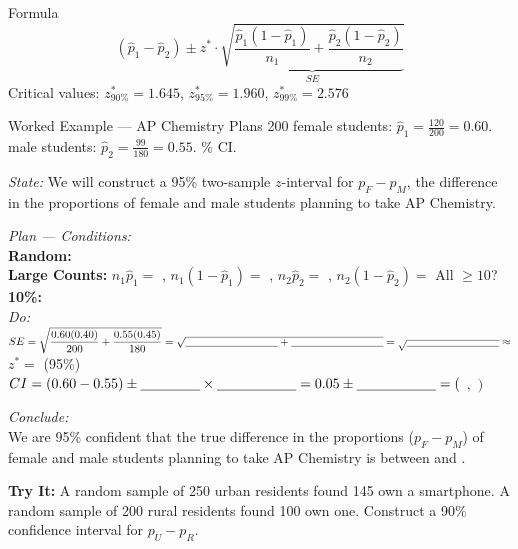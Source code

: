 \documentclass[10pt]{article}
\begin{document}
\begin{notesbox}{Formula}
\[(\hat p_1 - \hat p_2) \pm z^* \cdot \underbrace{\sqrt{\dfrac{\hat p_1(1-\hat p_1)}{n_1}
    + \dfrac{\hat p_2(1-\hat p_2)}{n_2}}}_{SE}\]
\vspace{4pt}
Critical values: $z^*_{90\%}=1.645$, \quad $z^*_{95\%}=1.960$, \quad $z^*_{99\%}=2.576$
\end{notesbox}

\begin{notesbox}{Worked Example --- AP Chemistry Plans}
200 female students: $\hat p_1 = \frac{120}{200} = 0.60$.  male students: $\hat p_2 = \frac{99}{180} = 0.55$. \% CI.

\textit{State:} We will construct a 95\% two-sample $z$-interval for $p_F - p_M$, the difference
in the proportions of female and male students planning to take AP Chemistry.

\textit{Plan --- Conditions:}\\
\textbf{Random:} \blank{7cm} \\
\textbf{Large Counts:} $n_1\hat p_1 = $ \blank{2cm}, $n_1(1-\hat p_1) = $ \blank{2cm},
$n_2\hat p_2 = $ \blank{2cm}, $n_2(1-\hat p_2) = $ \blank{2cm} \quad All $\ge 10$? \blank{1.5cm}\\
\textbf{10\%:} \blank{7cm} \\[4pt]

\textit{Do:}\\
$SE = \sqrt{\dfrac{0.60(0.40)}{200}+\dfrac{0.55(0.45)}{180}}
     = \sqrt{\blank{3cm}+\blank{3cm}} = \sqrt{\blank{3cm}} \approx $ \blank{2cm} \\[8pt]
$z^* = $ \blank{1.5cm} \quad (95\%)\\[4pt]
$CI = (0.60 - 0.55) \pm \blank{1.5cm}\times\blank{2cm} = 0.05 \pm \blank{2cm}
    = ($ \blank{2.5cm}$,$ \blank{2.5cm}$)$

\textit{Conclude:}\\
We are 95\% confident that the true difference in the proportions ($p_F - p_M$) of female
and male students planning to take AP Chemistry is between \blank{2cm} and \blank{2cm}.
\end{notesbox}

\begin{practicebox}
\textbf{Try It:} A random sample of 250 urban residents found 145 own a smartphone.
A random sample of 200 rural residents found 100 own one.
Construct a 90\% confidence interval for $p_U - p_R$.
\end{practicebox}
\end{document}
